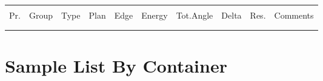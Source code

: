 \documentclass[6pt]{report}
\begin{document}
\begin{longtable}{|p{0.3cm}|p{1.5cm}|p{0.75cm}|p{2.4cm}|p{0.85cm}|p{.8cm}|p{.8cm}|p{0.5cm}|p{0.5cm}|p{4cm}|}
{{{{{{{%
\multicolumn{10}{c}{} \\
\multicolumn{1}{|c|}{\cellcolor[gray]{.9}Pr.} & 
\multicolumn{1}{c|}{\cellcolor[gray]{.9}Group} & 
\multicolumn{1}{c|}{\cellcolor[gray]{.9}Type} & 
\multicolumn{1}{c|}{\cellcolor[gray]{.9}Plan} & 
\multicolumn{1}{c|}{\cellcolor[gray]{.9}Edge} & 
\multicolumn{1}{c|}{\cellcolor[gray]{.9}Energy} & 
\multicolumn{1}{c|}{\cellcolor[gray]{.9}Tot.Angle} & 
\multicolumn{1}{c|}{\cellcolor[gray]{.9}Delta} & 
\multicolumn{1}{c|}{\cellcolor[gray]{.9}Res.} & 
\multicolumn{1}{c|}{\cellcolor[gray]{.9}Comments} \\  \hline {%
\multicolumn{10}{|c|}{} \\ \hline
{%

{%
\end{longtable}

\newpage

\section*{Sample List By Container}
\end{document}
